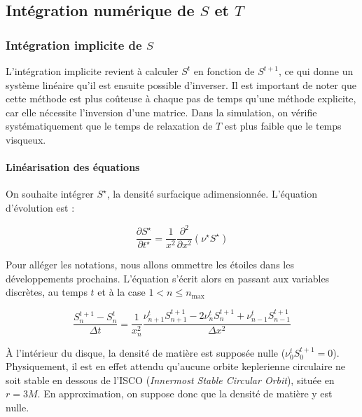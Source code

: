 \subsection{Intégration numérique de $S$ et $T$}

\subsubsection{Intégration implicite de $S$}

\label{ssec:integration_S_imp}

L'intégration implicite revient à calculer $S^t$ en fonction de $S^{t+1}$, ce
qui donne un système linéaire qu'il est ensuite possible d'inverser. Il est
important de noter que cette méthode est plus coûteuse à chaque pas de temps
qu'une méthode explicite, car elle nécessite l'inversion d'une matrice. Dans la simulation,
on vérifie systématiquement que le temps de relaxation de $T$ est plus faible que le temps 
visqueux.

\paragraph{Linéarisation des équations}

On souhaite intégrer $S^\star$, la densité surfacique adimensionnée. L'équation
d'évolution est :

\begin{equation}
  \frac{\partial S^\star}{\partial t^\star} = \frac{1}{x^2}\frac{\partial^2}{\partial x^2}\left(\nu^\star S^\star\right)
\end{equation}

Pour alléger les notations, nous allons ommettre les étoiles dans les
développements prochains. L'équation s'écrit alors en passant aux variables
discrètes, au temps $t$ et à la case $1<n\leq n_\textrm{max}$

\begin{equation}
  \label{eq:S_discret_n}
  \frac{S^{t+1}_n - S^t_n}{\Delta t} = \frac{1}{x_n^2}\frac{\nu^t_{n+1}S^{t+1}_{n+1} - 2 \nu^t_nS^{t+1}_n + \nu^t_{n-1}S^{t+1}_{n-1}}{\Delta x^2}
\end{equation}

À l'intérieur du disque, la densité de matière est supposée nulle
($\nu^t_{0}S^{t+1}_{0} = 0$). Physiquement, il est en effet attendu qu'aucune
orbite keplerienne circulaire ne soit stable en dessous de l'ISCO
(\emph{\emph{I}nnermost \emph{S}table \emph{C}ircular \emph{O}rbit}), située en
$r = 3M$. En approximation, on suppose donc que la densité de matière y est
nulle.


